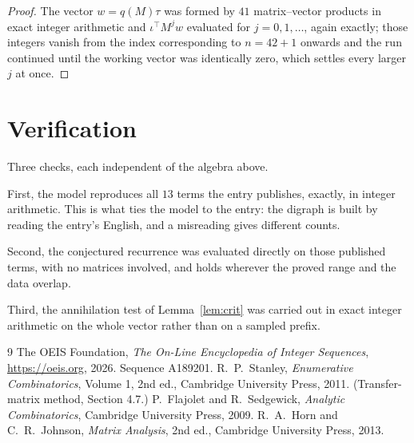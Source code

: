 \documentclass[11pt,a4paper]{article}
\theoremstyle{plain}
\theoremstyle{definition}
\begin{document}
\begin{proof}
The vector $w=q(M)\tau$ was formed by $41$ matrix--vector products in exact integer
arithmetic and $\iota^{\!\top}M^{j}w$ evaluated for $j=0,1,\dots$, again exactly; those
integers vanish from the index corresponding to $n=42+1$ onwards and the run continued
until the working vector was identically zero, which settles every larger $j$ at once.
\end{proof}

\section{Verification}

Three checks, each independent of the algebra above.

First, the model reproduces all $13$ terms the entry publishes, exactly, in integer
arithmetic. This is what ties the model to the entry: the digraph is built by reading the
entry's English, and a misreading gives different counts.

Second, the conjectured recurrence was evaluated directly on those published terms, with no
matrices involved, and holds wherever the proved range and the data overlap.

Third, the annihilation test of Lemma~\ref{lem:crit} was carried out in exact integer
arithmetic on the whole vector rather than on a sampled prefix.

\begin{thebibliography}{9}
 The OEIS Foundation, \emph{The On-Line Encyclopedia of Integer
Sequences}, \url{https://oeis.org}, 2026. Sequence A189201.
 R.~P.~Stanley, \emph{Enumerative Combinatorics}, Volume 1, 2nd ed.,
Cambridge University Press, 2011. (Transfer-matrix method, Section 4.7.)
 P.~Flajolet and R.~Sedgewick, \emph{Analytic Combinatorics}, Cambridge
University Press, 2009.
 R.~A.~Horn and C.~R.~Johnson, \emph{Matrix Analysis}, 2nd ed., Cambridge
University Press, 2013.
\end{thebibliography}
\end{document}
